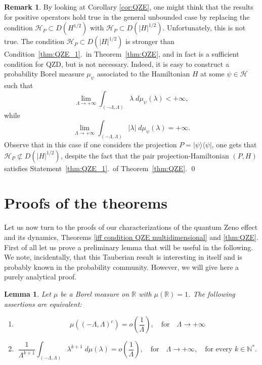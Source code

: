 \documentclass[aip,jmp,12pt
]{revtex4}
\newcommand{\RM}{\mathbb{R}}
\newcommand{\NM}{\mathbb{N}}
\newtheorem{lemma}{Lemma}
\theoremstyle{definition}
\newtheorem{remark}{Remark}
\begin{document}
\begin{remark}
By looking at Corollary \ref{cor:QZE}, one might think that the results for positive operators hold true in the general unbounded case by replacing the condition $\mathcal{H}_{P} \subset D(H^{1/2})$ with $\mathcal{H}_{P} \subset D(|H|^{1/2})$. Unfortunately, this is not true. The condition $\mathcal{H}_{P} \subset D(|H|^{1/2})$ is stronger than Condition~\ref{thm:QZE_1}.\ in Theorem~\ref{thm:QZE}, and in fact is a sufficient condition for QZD, but is not necessary. Indeed, it is easy to construct a probability Borel measure $\mu_{\psi}$ associated to the Hamiltonian $H$ at some $\psi \in \mathcal{H}$ such that
$$
\lim_{\Lambda \to +\infty} \int_{(-\Lambda,\Lambda)} \lambda \; d\mu_{\psi}(\lambda) <+\infty,
$$
while
$$
\lim_{\Lambda \to +\infty} \int_{(-\Lambda,\Lambda)} |\lambda| \; d\mu_{\psi}(\lambda) =+\infty.
$$
Observe that in this case if one considers the projection $P=|\psi\rangle \langle \psi|$, one gets that $\mathcal{H}_{P} \not\subset D(|H|^{1/2}) $, despite the fact that the pair  projection-Hamiltonian $(P,H)$ satisfies Statement~\ref{thm:QZE_1}.\ of Theorem~\ref{thm:QZE}. \qed
\end{remark}


\section{\label{sec:iff condition}Proofs of the theorems}


Let us now turn to the proofs of our characterizations of the quantum Zeno
effect and its dynamics, Theorems \ref{iff condition QZE multidimensional} and \ref{thm:QZE}.
First of all let us prove a preliminary lemma that will be useful in the following. We note, incidentally, that this Tauberian result is interesting in itself and is probably known in the probability community. However, we will give here a purely analytical proof.
\begin{lemma}\label{tauberian lemma}
Let $\mu$ be a Borel measure on $\RM$ with $\mu(\RM)=1$. 
The following assertions are equivalent:
\begin{enumerate}
    \item
    \begin{equation*}
      \mu((-\Lambda,\Lambda)^c) = o\left( \frac{1}{\Lambda} \right), \quad \mathrm{for} \quad \Lambda \to + \infty
    \end{equation*}
    \item
      \begin{equation*}
        \frac{1}{\Lambda^{k+1}}\int_{(-\Lambda,\Lambda)} \lambda^{k+1}\; d\mu(\lambda) = o\left( \frac{1}{\Lambda} \right), \quad \mathrm{for} \quad \Lambda \to + \infty, \quad
        \textrm{for every $k \in \NM^*$}.
      \end{equation*}
    \end{enumerate}
\end{lemma}
\end{document}
